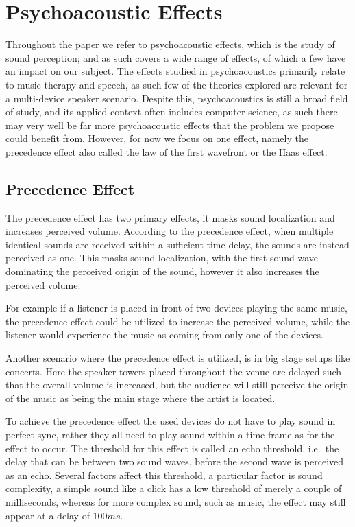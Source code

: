 \section{Psychoacoustic Effects}
Throughout the paper we refer to psychoacoustic effects, which is the study of sound perception;
and as such covers a wide range of effects, of which a few have an impact on our subject.
The effects studied in psychoacoustics primarily relate to music therapy and speech, as such few of the theories explored are relevant for a multi-device speaker scenario.
Despite this, psychoacoustics is still a broad field of study, and its applied context often includes computer science, as such there may very well be far more psychoacoustic effects that the problem we propose could benefit from.
However, for now we focus on one effect, namely the precedence effect also called the law of the first wavefront or the Haas effect.

\subsection{Precedence Effect}
The precedence effect has two primary effects, it masks sound localization and increases perceived volume.
According to the precedence effect, when multiple identical sounds are received within a sufficient time delay, the sounds are instead perceived as one.
This masks sound localization, with the first sound wave dominating the perceived origin of the sound, however it also increases the perceived volume.

\bigskip
For example if a listener is placed in front of two devices playing the same music, the precedence effect could be utilized to increase the perceived volume, while the listener would experience the music as coming from only one of the devices.

Another scenario where the precedence effect is utilized, is in big stage setups like concerts.
Here the speaker towers placed throughout the venue are delayed such that the overall volume is increased, but the audience will still perceive the origin of the music as being the main stage where the artist is located.

\bigskip
To achieve the precedence effect the used devices do not have to play sound in perfect sync, rather they all need to play sound within a time frame as for the effect to occur.
The threshold for this effect is called an echo threshold, i.e.~the delay that can be between two sound waves, before the second wave is perceived as an echo.
Several factors affect this threshold, a particular factor is sound complexity, a simple sound like a click has a low threshold of merely a couple of milliseconds, whereas for more complex sound, such as music, the effect may still appear at a delay of $100 ms$.\cite{precedence_wiki}

